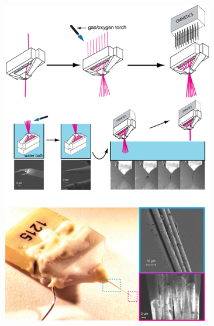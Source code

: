 \documentclass{beamer}
\begin{document}
\begin{frame}[plain]
  \begin{center}
    \includegraphics[height=\textheight]{julia_electrodes}
  \end{center}
\end{frame}
\end{document}

